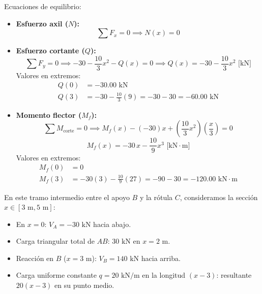 Ecuaciones de equilibrio:
\begin{itemize}
    \item \textbf{Esfuerzo axil ($N$):}
          \begin{equation}
              \sum F_x = 0 \implies \boxed{N(x) = 0}
          \end{equation}
    \item \textbf{Esfuerzo cortante ($Q$):}
          \begin{equation}
              \sum F_y = 0 \implies -30 - \frac{10}{3}x^2 - Q(x) = 0 \implies \boxed{Q(x) = -30 - \frac{10}{3}x^2\text{ [kN]}}
          \end{equation}
          Valores en extremos:
          \begin{align*}
              Q(0) & = -30.00\text{ kN}                                    \\
              Q(3) & = -30 - \frac{10}{3}(9) = -30 - 30 = -60.00\text{ kN}
          \end{align*}
    \item \textbf{Momento flector ($M_f$):}
          \begin{equation}
              \sum M_{\text{corte}} = 0 \implies M_f(x) - (-30)x + \left(\frac{10}{3}x^2\right)\left(\frac{x}{3}\right) = 0
          \end{equation}
          \begin{equation}
              \boxed{M_f(x) = -30\,x - \frac{10}{9}x^3\text{ [kN}\cdot\text{m]}}
          \end{equation}
          Valores en extremos:
          \begin{align*}
              M_f(0) & = 0                                                                     \\
              M_f(3) & = -30(3) - \frac{10}{9}(27) = -90 - 30 = -120.00\text{ kN}\cdot\text{m}
          \end{align*}
\end{itemize}


En este tramo intermedio entre el apoyo $B$ y la rótula $C$, consideramos la sección $x \in [3\text{ m}, 5\text{ m}]$:
\begin{itemize}
    \item En $x = 0$: $V_A = -30\text{ kN}$ hacia abajo.
    \item Carga triangular total de $AB$: $30\text{ kN}$ en $x = 2\text{ m}$.
    \item Reacción en $B$ ($x = 3\text{ m}$): $V_B = 140\text{ kN}$ hacia arriba.
    \item Carga uniforme constante $q = 20\text{ kN/m}$ en la longitud $(x - 3)$: resultante $20(x - 3)$ en su punto medio.
\end{itemize}

